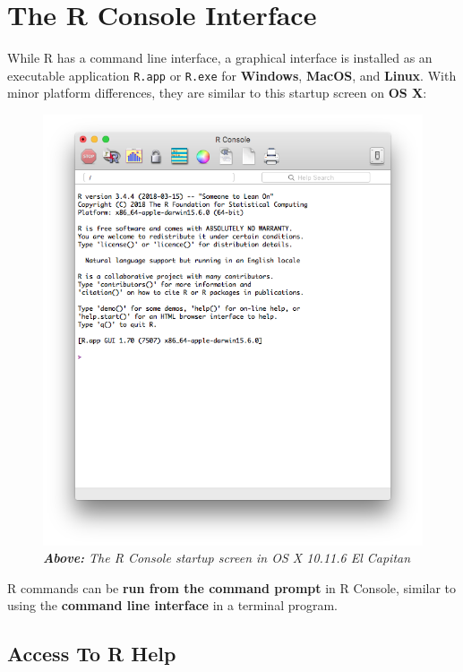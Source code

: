 \documentclass[]{book}
\theoremstyle{definition}
\theoremstyle{definition}
\theoremstyle{definition}
\theoremstyle{remark}
\begin{document}
\hypertarget{the-r-console-interface}{%
\section{The R Console Interface}\label{the-r-console-interface}}

While R has a command line interface, a graphical interface is installed
as an executable application \texttt{R.app} or \texttt{R.exe} for
\textbf{Windows}, \textbf{MacOS}, and \textbf{Linux}. With minor
platform differences, they are similar to this startup screen on
\textbf{OS X}:

\begin{figure}
\centering
\includegraphics{images/R_Console.png}
\caption{\emph{\textbf{Above:} The R Console startup screen in OS X
10.11.6 El Capitan}}
\end{figure}

R commands can be \textbf{run from the command prompt} in R Console,
similar to using the \textbf{command line interface} in a terminal
program.

\hypertarget{access-to-r-help}{%
\subsection{Access To R Help}\label{access-to-r-help}}
\end{document}
